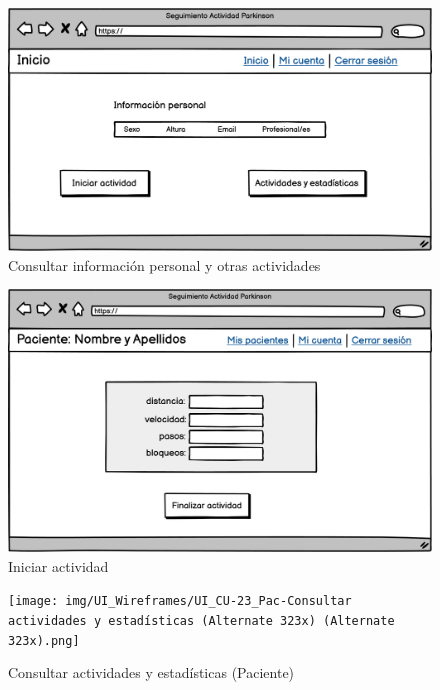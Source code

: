 \begin{figure}[h]
    \centering
    \includegraphics[width=1\textwidth]{img/UI_Wireframes/UI_CU-17_Consultar info personal y otras actividades.png}
    \caption{Consultar información personal y otras actividades}
    \label{fig:Consultar info personal y otras actividades}
\end{figure}

\begin{figure}[h]
    \centering
    \includegraphics[width=1\textwidth]{img/UI_Wireframes/UI_CU-19_Iniciar actividad.png}
    \caption{Iniciar actividad}
    \label{fig:Iniciar actividad}
\end{figure}

\begin{figure}[h]
    \centering
    \texttt{[image: img/UI\_Wireframes/UI\_CU-23\_Pac-Consultar actividades y estadísticas (Alternate 323x) (Alternate 323x).png]}
    \caption{Consultar actividades y estadísticas (Paciente)}
    \label{fig:Consultar actividades y estadísticas (Paciente)}
\end{figure}

